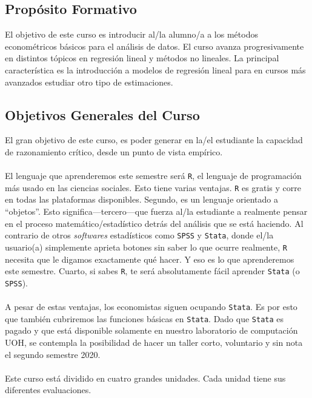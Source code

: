 \documentclass[letterpaper]{article}
\begin{document}
\subsection*{Prop\'osito Formativo}

El objetivo de este curso es introducir al/la alumno/a a los m\'etodos econom\'etricos b\'asicos para el an\'alisis de datos. El curso avanza progresivamente en distintos t\'opicos en regresi\'on lineal y m\'etodos no lineales. La principal caracter\'istica es la introducci\'on a modelos de regresi\'on lineal para en cursos m\'as avanzados estudiar otro tipo de estimaciones.


\subsection*{Objetivos Generales del Curso}

El gran objetivo de este curso, es poder generar en la/el estudiante la capacidad de razonamiento cr\'itico, desde un punto de vista emp\'irico. 
\\
\\
El lenguaje que aprenderemos este semestre ser\'a \texttt{R}, el lenguaje de programaci\'on m\'as usado en las ciencias sociales. Esto tiene varias ventajas. \texttt{R} es gratis y corre en todas las plataformas disponibles. Segundo, es un lenguaje orientado a ``objetos''. Esto significa---tercero---que fuerza al/la estudiante a realmente pensar en el proceso matem\'atico/estad\'istico detr\'as del an\'alisis que se est\'a haciendo. Al contrario de otros \emph{softwares} estad\'isticos como \texttt{SPSS} y \texttt{Stata}, donde el/la usuario(a) simplemente aprieta botones sin saber lo que ocurre realmente, \texttt{R} necesita que le digamos exactamente qu\'e hacer. Y eso es lo que aprenderemos este semestre. Cuarto, si sabes \texttt{R}, te ser\'a absolutamente f\'acil aprender \texttt{Stata} (o \texttt{SPSS}).
\\
\\
A pesar de estas ventajas, los economistas siguen ocupando \texttt{Stata}. Es por esto que tambi\'en cubriremos las funciones b\'asicas en \texttt{Stata}. Dado que \texttt{Stata} es pagado y que est\'a disponible solamente en nuestro laboratorio de computaci\'on UOH, se contempla la posibilidad de hacer un taller corto, voluntario y sin nota el segundo semestre 2020. 
\\
\\
Este curso est\'a dividido en cuatro grandes unidades. Cada unidad tiene sus diferentes evaluaciones.
\end{document}
